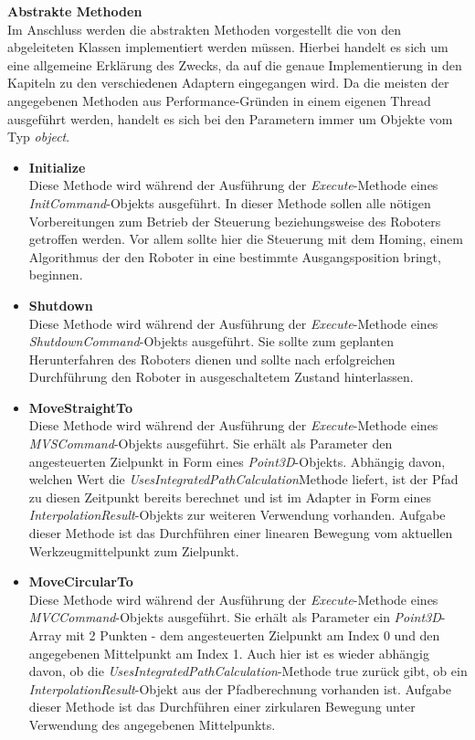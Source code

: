 \textbf{Abstrakte Methoden}\\
Im Anschluss werden die abstrakten Methoden vorgestellt die von den abgeleiteten Klassen implementiert werden müssen. Hierbei handelt es sich um eine allgemeine Erklärung des Zwecks, da auf die genaue Implementierung in den Kapiteln zu den verschiedenen Adaptern eingegangen wird. Da die meisten der angegebenen Methoden aus Performance-Gründen in einem eigenen Thread ausgeführt werden, handelt es sich bei den Parametern immer um Objekte vom Typ \textit{object}. 
\begin{itemize}
\item \textbf{Initialize}\\
Diese Methode wird während der Ausführung der \textit{Execute}-Methode eines \textit{InitCommand}-Objekts ausgeführt. In dieser Methode sollen alle nötigen Vorbereitungen zum Betrieb der Steuerung beziehungsweise des Roboters getroffen werden. Vor allem sollte hier die Steuerung mit dem Homing, einem Algorithmus der den Roboter in eine bestimmte Ausgangsposition bringt, beginnen.
\item \textbf{Shutdown}\\
Diese Methode wird während der Ausführung der \textit{Execute}-Methode eines \textit{ShutdownCommand}-Objekts ausgeführt. Sie sollte zum geplanten Herunterfahren des Roboters dienen und sollte nach erfolgreichen Durchführung den Roboter in ausgeschaltetem Zustand hinterlassen.
\item \textbf{MoveStraightTo}\\
Diese Methode wird während der Ausführung der \textit{Execute}-Methode eines \textit{MVSCommand}-Objekts ausgeführt. Sie erhält als Parameter den angesteuerten Zielpunkt in Form eines \textit{Point3D}-Objekts. Abhängig davon, welchen Wert die \textit{UsesIntegratedPathCalculation}Methode liefert, ist der Pfad zu diesen Zeitpunkt bereits berechnet und ist im Adapter in Form eines \textit{InterpolationResult}-Objekts zur weiteren Verwendung vorhanden. Aufgabe dieser Methode ist das Durchführen einer linearen Bewegung vom aktuellen Werkzeugmittelpunkt zum Zielpunkt.
\item \textbf{MoveCircularTo}\\
Diese Methode wird während der Ausführung der \textit{Execute}-Methode eines \textit{MVCCommand}-Objekts ausgeführt. Sie erhält als Parameter ein \textit{Point3D}-Array mit 2 Punkten - dem angesteuerten Zielpunkt am Index 0 und den angegebenen Mittelpunkt am Index 1. Auch hier ist es wieder abhängig davon, ob die \textit{UsesIntegratedPathCalculation}-Methode true zurück gibt, ob ein \textit{InterpolationResult}-Objekt aus der Pfadberechnung vorhanden ist. Aufgabe dieser Methode ist das Durchführen einer zirkularen Bewegung unter Verwendung des angegebenen Mittelpunkts.

\end{itemize}
